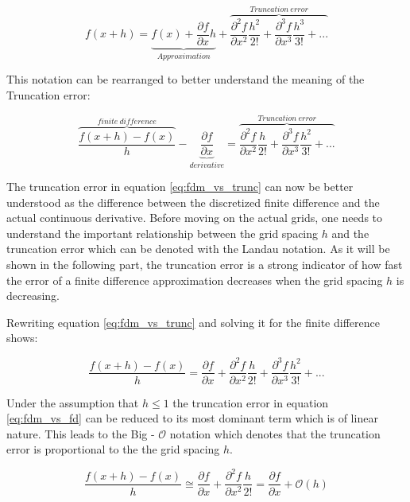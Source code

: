 \begin{equation}
f(x+h) =
\underbrace{f(x) + \frac {\partial f}{\partial x} h}_{Approximation} + 
\overbrace{\frac {\partial^2 f}{\partial x^2} \frac {h^2}{2!} + \frac {\partial^3 f}{\partial x^3} \frac {h^3}{3!} + ...}^{Truncation\ error}
\end{equation}

This notation can be rearranged to better understand the meaning of the Truncation error:


\begin{equation}\label{eq:fdm_vs_trunc}
\overbrace{\frac {f(x+h) - f(x)}{h}}^{finite\ difference} - 
\underbrace{\frac{\partial f}{\partial x}}_{derivative} =
\overbrace{\frac {\partial^2 f}{\partial x^2} \frac {h}{2!} + \frac {\partial^3 f}{\partial x^3} \frac {h^2}{3!} + ...}^{Truncation\ error}
\end{equation}

The truncation error in equation \ref{eq:fdm_vs_trunc} can now be better understood as the difference between the discretized finite difference and the actual continuous derivative. Before moving on the actual grids, one needs to understand the important relationship between the grid spacing $h$ and the 
truncation error which can be denoted with the Landau notation. As it will be shown in the following part, the truncation error is a strong indicator of how fast the error of a finite difference approximation decreases when the grid spacing $h$ is decreasing.

Rewriting equation \ref{eq:fdm_vs_trunc} and solving it for the finite difference
shows:

\begin{equation}\label{eq:fdm_vs_fd}
\frac {f(x+h) - f(x)}{h} = 
\frac{\partial f}{\partial x} + 
\frac {\partial^2 f}{\partial x^2} \frac {h}{2!} + \frac {\partial^3 f}{\partial x^3} \frac {h^2}{3!} + ...
\end{equation}

Under the assumption that $h \leq 1 $ the truncation error in equation \ref{eq:fdm_vs_fd} can be reduced to its most dominant term which is of linear nature. This leads to the Big - $\mathcal{O}$ notation which denotes that the truncation error is proportional to the  the grid spacing $h$.

\begin{equation}\label{eq:fdm_vs_linod}
\frac {f(x+h) - f(x)}{h} \cong
\frac{\partial f}{\partial x} + 
\frac {\partial^2 f}{\partial x^2} \frac {h}{2!} = 
\frac{\partial f}{\partial x} + \mathcal{O}(h)
\end{equation}

